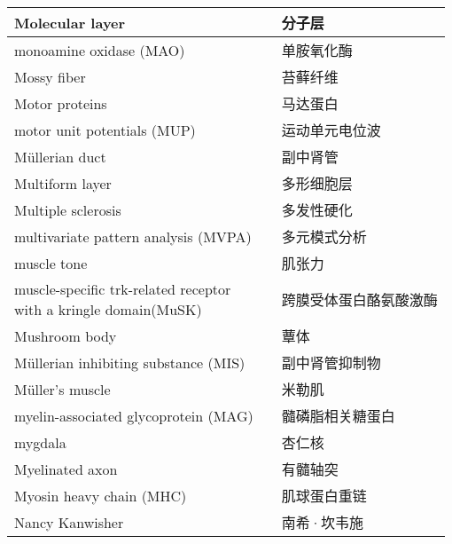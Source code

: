 \begin{longtable}{lll}
	\midrule
	Molecular layer   && 分子层  \\
	
	\midrule
	monoamine oxidase (MAO)   && 单胺氧化酶  \\
	
	\midrule
	Mossy fiber   && 苔藓纤维  \\
	
	\midrule
	Motor proteins   && 马达蛋白  \\
	
	\midrule
	motor unit potentials (MUP)  && 运动单元电位波  \\
	
	\midrule
	Müllerian duct   && 副中肾管  \\
	
	\midrule
	Multiform layer   && 多形细胞层  \\
	
	\midrule
	Multiple sclerosis   && 多发性硬化  \\
	
	\midrule
	multivariate pattern analysis (MVPA)  && 多元模式分析  \\
	
	\midrule
	muscle tone   && 肌张力  \\
	
	\midrule
	\makecell{muscle-specific trk-related receptor \\with a kringle domain(MuSK)}   && 跨膜受体蛋白酪氨酸激酶  \\
	
	\midrule
	Mushroom body   && 蕈体  \\
	
	\midrule
	Müllerian inhibiting substance (MIS)   && 副中肾管抑制物  \\
	
	\midrule
	Müller's muscle   && 米勒肌  \\
	
	\midrule
	myelin-associated glycoprotein (MAG)     && 髓磷脂相关糖蛋白   \\
	
	\midrule
	mygdala     && 杏仁核   \\
	
	\midrule
	Myelinated axon     && 有髓轴突   \\
	
	\midrule
	Myosin heavy chain (MHC)    && 肌球蛋白重链   \\
	
	\midrule
	Nancy Kanwisher   &&  南希·坎韦施 \\
	

\end{longtable}

